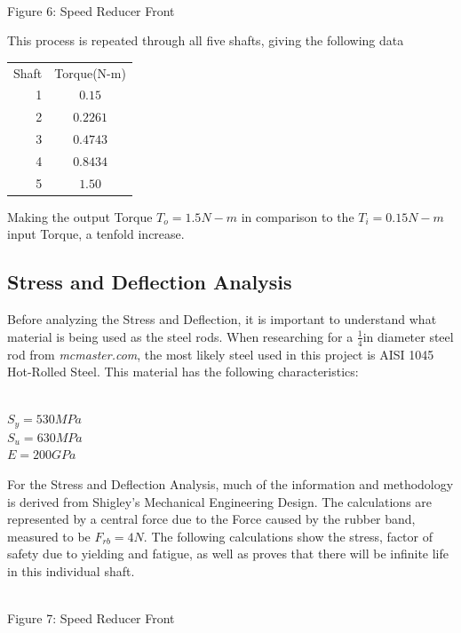 \documentclass{article}
\begin{document}
\begin{center}
\\
\scriptsize{
Figure 6: Speed Reducer Front
}
\end{center}

This process is repeated through all five shafts, giving the following data

 \begin{center}
     \begin{tabular}{r|c}
         Shaft & Torque(N-m) \\
         1 & $0.15$ \\
         2 & $0.2261$ \\
         3 & $0.4743$ \\
         4 & $0.8434$ \\
         5 & $1.50$ \\
      \end{tabular}
 \end{center}

Making the output Torque $T_o = 1.5N-m$ in comparison to the $T_i = 0.15N-m$ input Torque, a tenfold increase. 
\subsection{Stress and Deflection Analysis}
Before analyzing the Stress and Deflection, it is important to understand what material is being used as the steel rods. When researching for a $\frac{1}{4}$in diameter steel rod from \textit{mcmaster.com}, the most likely steel used in this project is AISI 1045 Hot-Rolled Steel. This material has the following characteristics:

$ $ \\
$ S_y = 530MPa$\\
$ S_u = 630MPa$ \\
$ E = 200GPa$

For the Stress and Deflection Analysis, much of the information and methodology is derived from Shigley's Mechanical Engineering Design. The calculations are represented by a central force due to the Force caused by the rubber band, measured to be $F_{rb} = 4N$. The following calculations show the stress, factor of safety due to yielding and fatigue, as well as proves that there will be infinite life in this individual shaft.

\begin{center}
\\
\scriptsize{
Figure 7: Speed Reducer Front
}
\end{center}
\end{document}

